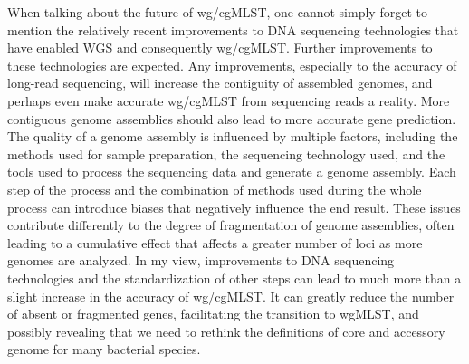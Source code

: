 When talking about the future of wg/cgMLST, one cannot simply forget to mention the relatively recent improvements to DNA sequencing technologies that have enabled WGS and consequently wg/cgMLST. Further improvements to these technologies are expected. Any improvements, especially to the accuracy of long-read sequencing, will increase the contiguity of assembled genomes, and perhaps even make accurate wg/cgMLST from sequencing reads a reality. More contiguous genome assemblies should also lead to more accurate gene prediction. The quality of a genome assembly is influenced by multiple factors, including the methods used for sample preparation, the sequencing technology used, and the tools used to process the sequencing data and generate a genome assembly. Each step of the process and the combination of methods used during the whole process can introduce biases that negatively influence the end result. These issues contribute differently to the degree of fragmentation of genome assemblies, often leading to a cumulative effect that affects a greater number of loci as more genomes are analyzed. In my view, improvements to DNA sequencing technologies and the standardization of other steps can lead to much more than a slight increase in the accuracy of wg/cgMLST. It can greatly reduce the number of absent or fragmented genes, facilitating the transition to wgMLST, and possibly revealing that we need to rethink the definitions of core and accessory genome for many bacterial species.

